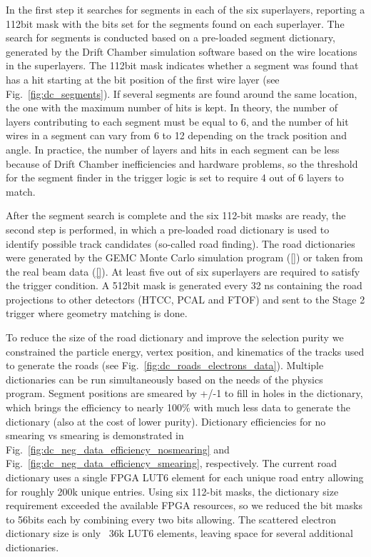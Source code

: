 In the first step it searches for segments in each of the six superlayers, reporting a 112bit mask with the bits set for the segments found on each superlayer. The search for segments is conducted based on a pre-loaded segment dictionary, generated by the Drift Chamber simulation software based on the wire locations in the superlayers. The 112bit mask indicates whether a segment was found that has a hit starting at the bit position of the first wire layer (see Fig.~\ref{fig:dc_segments}). If several segments are found around the same location, the one with the maximum number of hits is kept. In theory, the number of layers contributing to each segment must be equal to 6, and the number of hit wires in a segment can vary from 6 to 12 depending on the track position and angle. In practice, the number of layers and hits in each segment can be less because of Drift Chamber inefficiencies and hardware problems, so the threshold for the segment finder in the trigger logic is set to require 4 out of 6 layers to match.

After the segment search is complete and the six 112-bit masks are ready, the second step is performed, in which a pre-loaded road dictionary is used to identify possible track candidates (so-called road finding). The road dictionaries were generated by the GEMC Monte Carlo simulation program (\ref{}) or taken from the real beam data (\ref{}). At least five out of six superlayers are required to satisfy the trigger condition. A 512bit mask is generated every 32 ns containing the road projections to other detectors (HTCC, PCAL and FTOF) and sent to the Stage 2 trigger where geometry matching is done.

To reduce the size of the road dictionary and improve the selection purity we constrained the particle energy, vertex position, and kinematics of the tracks used to generate the roads (see Fig.~\ref{fig:dc_roads_electrons_data}). Multiple dictionaries can be run simultaneously based on the needs of the physics program. Segment positions are smeared by +/-1 to fill in holes in the dictionary, which brings the efficiency to nearly 100\% with much less data to generate the dictionary (also at the cost of lower purity). Dictionary efficiencies for no smearing vs smearing is demonstrated in Fig.~\ref{fig:dc_neg_data_efficiency_nosmearing} and Fig.~\ref{fig:dc_neg_data_efficiency_smearing}, respectively. The current road dictionary uses a single FPGA LUT6 element for each unique road entry allowing for roughly 200k unique entries. Using six 112-bit masks, the dictionary size requirement exceeded the available FPGA resources, so we reduced the bit masks to 56bits each by combining every two bits allowing. The scattered electron dictionary size is only ~36k LUT6 elements, leaving space for several additional dictionaries.

